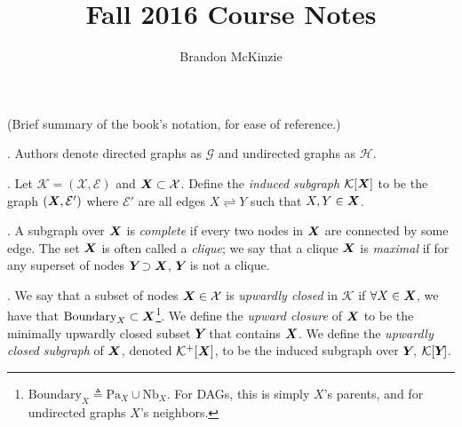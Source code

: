 \documentclass[11pt]{article}
\title{\vspace{-10mm}\fontsize{24pt}{8pt}\selectfont\textbf{Fall 2016 Course Notes}\vspace*{-4mm}}
\author{Brandon McKinzie}
\date{}
\begin{document}
\dosecttoc
\tableofcontents

\label{Probabilistic Graphical Models}




\newcommand{\sep}{\text{sep}_{\mathcal{H}}}
\newcommand{\Y}{\matr{Y}}
\renewcommand{\Z}{\matr{Z}}




\vspace{-1em}
{\footnotesize (Brief summary of the book's notation, for ease of reference.)}

\p {}. Authors denote directed graphs as $\mathcal G$ and undirected graphs as $\mathcal H$. 
\begin{compactitem}
	\item {}. Let $\mathcal K = (\mathcal X, \mathcal E)$ and $\bm{X}_{} \subset \mathcal X$. Define the \textit{induced subgraph} $\mathcal{K}[\bm{X}_{}]$ to be the graph $(\bm{X}_{}, \mathcal{E}')$ where $\mathcal{E}'$ are all edges $X \rightleftharpoons Y$ such that $X, Y \in \bm{X}_{}$.
	
	\item {}. A subgraph over $\bm{X}_{}$ is \textit{complete} if every two nodes in $\bm{X}_{}$ are connected by some edge. The set $\bm{X}_{}$ is often called a \textit{clique}; we say that a clique $\bm{X}_{}$ is \textit{maximal} if for any superset of nodes $\bm{Y}_{} \supset \bm{X}_{}$, $\bm{Y}_{}$ is not a clique.
	
	\item {}. We say that a subset of nodes $\bm{X}_{} \in \mathcal X$ is \textit{upwardly closed} in $\mathcal K$ if $\forall X \in \bm{X}_{}$, we have that $\text{Boundary}_X \subset \bm{X}_{}$\footnote{$\text{Boundary}_X \triangleq \text{Pa}_X \cup \text{Nb}_X$. For DAGs, this is simply $X$'s parents, and for undirected graphs $X$'s neighbors.}. We define the \textit{upward closure} of $\bm{X}_{}$ to be the minimally upwardly closed subset $\bm{Y}_{}$ that contains $\bm{X}_{}$. We define the \textit{upwardly closed subgraph} of $\bm{X}_{}$, denoted $\mathcal{K}^+[\bm{X}_{}]$, to be the induced subgraph over $\bm{Y}_{}$, $\mathcal{K}[\bm{Y}_{}]$. 
\end{compactitem}
\end{document}
